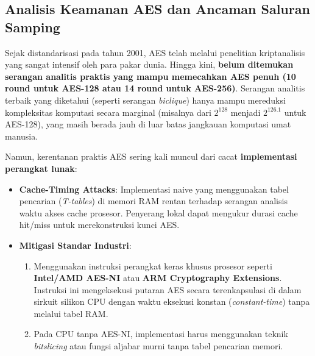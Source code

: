 \subsection{Analisis Keamanan AES dan Ancaman Saluran Samping}

Sejak distandarisasi pada tahun 2001, AES telah melalui penelitian kriptanalisis yang sangat intensif oleh para pakar dunia. Hingga kini, \textbf{belum ditemukan serangan analitis praktis yang mampu memecahkan AES penuh (10 round untuk AES-128 atau 14 round untuk AES-256)}. Serangan analitis terbaik yang diketahui (seperti serangan \textit{biclique}) hanya mampu mereduksi kompleksitas komputasi secara marginal (misalnya dari $2^{128}$ menjadi $2^{126.1}$ untuk AES-128), yang masih berada jauh di luar batas jangkauan komputasi umat manusia.

Namun, kerentanan praktis AES sering kali muncul dari cacat \textbf{implementasi perangkat lunak}:
\begin{itemize}
  \item \textbf{Cache-Timing Attacks}: Implementasi naive yang menggunakan tabel pencarian (\textit{T-tables}) di memori RAM rentan terhadap serangan analisis waktu akses cache prosesor. Penyerang lokal dapat mengukur durasi cache hit/miss untuk merekonstruksi kunci AES.
  \item \textbf{Mitigasi Standar Industri}:
  \begin{enumerate}
    \item Menggunakan instruksi perangkat keras khusus prosesor seperti \textbf{Intel/AMD AES-NI} atau \textbf{ARM Cryptography Extensions}. Instruksi ini mengeksekusi putaran AES secara terenkapsulasi di dalam sirkuit silikon CPU dengan waktu eksekusi konstan (\textit{constant-time}) tanpa melalui tabel RAM.
    \item Pada CPU tanpa AES-NI, implementasi harus menggunakan teknik \textit{bitslicing} atau fungsi aljabar murni tanpa tabel pencarian memori.
  \end{enumerate}
\end{itemize}

